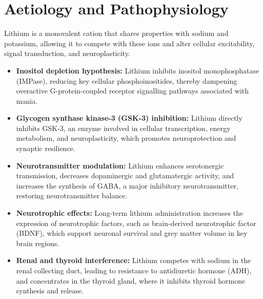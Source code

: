 \section*{Aetiology and Pathophysiology}
Lithium is a monovalent cation that shares properties with sodium and potassium, allowing it to compete with these ions and alter cellular excitability, signal transduction, and neuroplasticity.
\begin{itemize}
    \item \textbf{Inositol depletion hypothesis:} Lithium inhibits inositol monophosphatase (IMPase), reducing key cellular phosphoinositides, thereby dampening overactive G-protein-coupled receptor signalling pathways associated with mania.
    \item \textbf{Glycogen synthase kinase-3 (GSK-3) inhibition:} Lithium directly inhibits GSK-3, an enzyme involved in cellular transcription, energy metabolism, and neuroplasticity, which promotes neuroprotection and synaptic resilience.
    \item \textbf{Neurotransmitter modulation:} Lithium enhances serotonergic transmission, decreases dopaminergic and glutamatergic activity, and increases the synthesis of GABA, a major inhibitory neurotransmitter, restoring neurotransmitter balance.
    \item \textbf{Neurotrophic effects:} Long-term lithium administration increases the expression of neurotrophic factors, such as brain-derived neurotrophic factor (BDNF), which support neuronal survival and grey matter volume in key brain regions.
    \item \textbf{Renal and thyroid interference:} Lithium competes with sodium in the renal collecting duct, leading to resistance to antidiuretic hormone (ADH), and concentrates in the thyroid gland, where it inhibits thyroid hormone synthesis and release.
\end{itemize}

